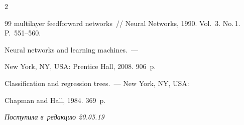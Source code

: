 \begin{multicols}{2}
{{\begin{thebibliography}{99}
multilayer feedforward networks~// Neural Networks, 1990. Vol.~3. No.\,1. P.~551--560.







 Neural networks and learning machines.~--- 


New York, NY, USA: Prentice Hall,  2008. 906~p.









Classification and regression trees.~--- New York, NY, USA: 


Chapman and Hall, 1984. 369~p.













\end{thebibliography}





 }


 }





\end{multicols}





\vspace*{-6pt}





\hfill{\small\textit{Поступила в~редакцию 20.05.19}}





\vspace*{8pt}















